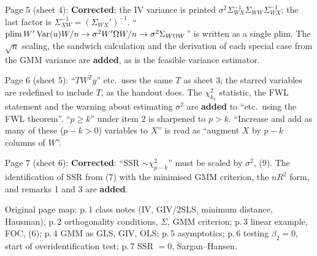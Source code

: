 \documentclass[11pt]{article}
\begin{document}
\begin{transcriptnotes}
 \item Page 5 (sheet 4): \textbf{Corrected}: the IV variance is printed $\sigma^{2}\Sigma_{WX}^{-1}\Sigma_{WW}\Sigma_{WX}^{-1}$; the last factor
       is $\Sigma_{XW}^{-1}=(\Sigma_{WX}')^{-1}$. ``$\operatorname{plim}W'\operatorname{Var}(u)W/n\to\sigma^{2}W'\Omega W/n\to\sigma^{2}\Sigma_{W\Omega W}$'' is written as
       a single plim. The $\sqrt n$ scaling, the sandwich calculation and the derivation of each special
       case from the GMM variance are \textbf{added}, as is the feasible variance estimator.
 \item Page 6 (sheet 5): ``$T W^{T}y$'' etc.\ uses the same $T$ as sheet 3; the starred variables are
       redefined to include $T$, as the handout does. The $\chi^{2}_{k_{2}}$ statistic, the FWL statement and the
       warning about estimating $\sigma^{2}$ are \textbf{added} to ``etc.\ using the FWL theorem''. ``$p\ge k$'' under
       item 2 is sharpened to $p>k$. ``Increase and add as many of these ($p-k>0$) variables to $X$'' is read
       as ``augment $X$ by $p-k$ columns of $W$''.
 \item Page 7 (sheet 6): \textbf{Corrected}: ``SSR $\sim\chi^{2}_{p-k}$'' must be scaled by $\sigma^{2}$, (9). The identification of
       SSR from (7) with the minimised GMM criterion, the $nR^{2}$ form, and remarks 1 and 3 are \textbf{added}.
 \item Original page map: p.\,1 class notes (IV, GIV/2SLS, minimum distance, Hausman); p.\,2 orthogonality
       conditions, $\Sigma$, GMM criterion; p.\,3 linear example, FOC, (6); p.\,4 GMM as GLS, GIV, OLS; p.\,5
       asymptotics; p.\,6 testing $\beta_{2}=0$, start of overidentification test; p.\,7 SSR $=0$, Sargan--Hansen.
\end{transcriptnotes}
\end{document}
